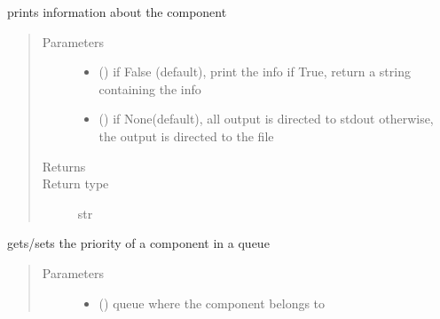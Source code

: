 \documentclass[letterpaper,10pt,english]{sphinxmanual}
\begin{document}
\begin{fulllineitems}
\begin{fulllineitems}
\begin{quote}
\begin{description}
\begin{itemize}
\end{itemize}

\end{description}\end{quote}

\end{fulllineitems}


\begin{fulllineitems}
\label{\detokenize{Reference:salabim.Component.print_info}}
prints information about the component
\begin{quote}\begin{description}
\item[{Parameters}] \leavevmode\begin{itemize}
\item {} 
 () \textendash{} if False (default), print the info
if True, return a string containing the info

\item {} 
 () \textendash{} if None(default), all output is directed to stdout 
otherwise, the output is directed to the file

\end{itemize}

\item[{Returns}] \leavevmode
{}

\item[{Return type}] \leavevmode
str

\end{description}\end{quote}

\end{fulllineitems}


\begin{fulllineitems}
\label{\detokenize{Reference:salabim.Component.priority}}
gets/sets the priority of a component in a queue
\begin{quote}\begin{description}
\item[{Parameters}] \leavevmode\begin{itemize}
\item {} 
 ({\hyperref[\detokenize{Reference:salabim.Queue}]{}}) \textendash{} queue where the component belongs to


\end{itemize}
\end{description}
\end{quote}
\end{fulllineitems}
\end{fulllineitems}
\end{document}

